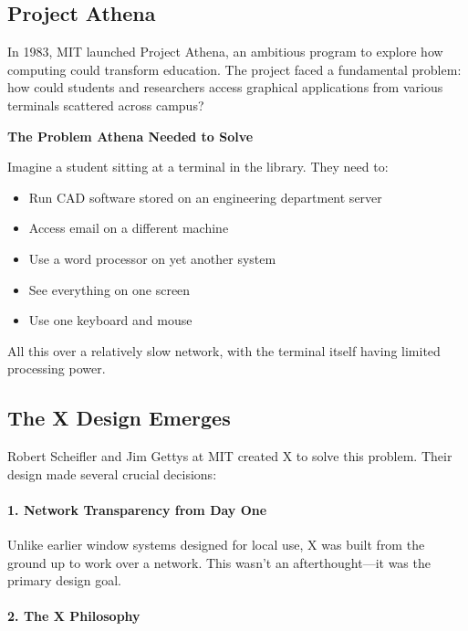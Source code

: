 \subsection{Project Athena}

In 1983, MIT launched Project Athena, an ambitious program to explore how computing could transform education. The project faced a fundamental problem: how could students and researchers access graphical applications from various terminals scattered across campus?

\begin{examplebox}
\textbf{The Problem Athena Needed to Solve}

Imagine a student sitting at a terminal in the library. They need to:
\begin{itemize}
    \item Run CAD software stored on an engineering department server
    \item Access email on a different machine
    \item Use a word processor on yet another system
    \item See everything on one screen
    \item Use one keyboard and mouse
\end{itemize}

All this over a relatively slow network, with the terminal itself having limited processing power.
\end{examplebox}

\subsection{The X Design Emerges}

Robert Scheifler and Jim Gettys at MIT created X to solve this problem. Their design made several crucial decisions:

\paragraph{1. Network Transparency from Day One}

Unlike earlier window systems designed for local use, X was built from the ground up to work over a network. This wasn't an afterthought—it was the primary design goal.

\paragraph{2. The X Philosophy}

